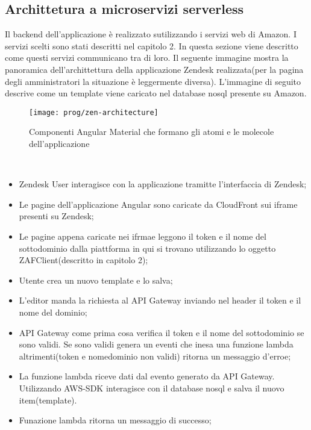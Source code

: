 \subsection{Archittetura a microservizi serverless}
Il backend dell'applicazione è realizzato sutilizzando i servizi web di Amazon. I servizi scelti sono stati descritti nel capitolo 2. In questa sezione viene descritto come questi servizi communicano tra di loro. Il seguente immagine mostra la panoramica dell'archittettura della applicazione Zendesk realizzata(per la pagina degli amministratori la situazione è leggermente diversa). L'immagine di seguito descrive come un template viene caricato nel database nosql presente su Amazon. 
\begin{figure}[!h] 
	\centering 
	\texttt{[image: prog/zen-architecture]} 
	\caption{Componenti Angular Material che formano gli atomi e le molecole dell'applicazione}
\end{figure} 
\\
\begin{itemize}
	\item Zendesk User interagisce con la applicazione tramitte l'interfaccia di Zendesk;
	\item Le pagine dell'applicazione Angular sono caricate da CloudFront sui iframe presenti su Zendesk;
	\item Le pagine appena caricate nei ifrmae leggono il token e il nome del sottodominio dalla piattforma in qui si trovano utilizzando lo oggetto ZAFClient(descritto in capitolo 2);
	\item Utente crea un nuovo template e lo salva;
	\item L'editor manda la richiesta al API Gateway inviando nel header il token e il nome del dominio;
	\item API Gateway come prima cosa verifica il token e il nome del sottodominio se sono validi. Se sono validi genera un eventi che inesa una funzione lambda altrimenti(token e nomedominio non validi) ritorna un messaggio d'erroe;
	\item La funzione lambda riceve dati dal evento generato da API Gateway. Utilizzando AWS-SDK interagisce con il database nosql e salva il nuovo item(template).
	\item Funazione lambda ritorna un messaggio di successo;
\end{itemize}
